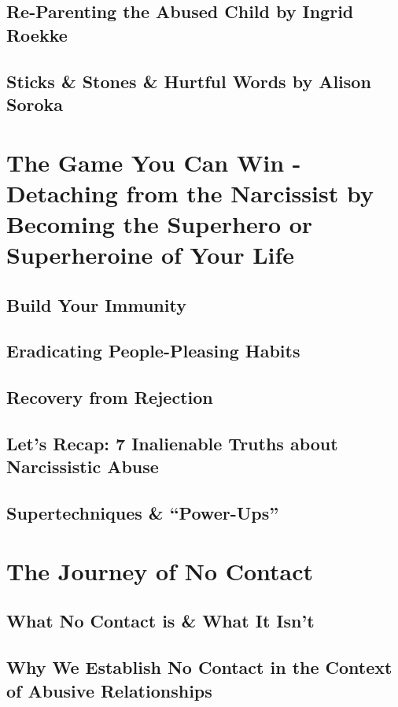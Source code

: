 \documentclass[oneside]{book}
\numberwithin{equation}{section}
\begin{document}
\subsection{Re-Parenting the Abused Child by Ingrid Roekke}

\subsection{Sticks \& Stones \& Hurtful Words by Alison Soroka}

\section{The Game You Can Win - Detaching from the Narcissist by Becoming the Superhero or Superheroine of Your Life}

\subsection{Build Your Immunity}

\subsection{Eradicating People-Pleasing Habits}

\subsection{Recovery from Rejection}

\subsection{Let's Recap: 7 Inalienable Truths about Narcissistic Abuse}

\subsection{Supertechniques \& ``Power-Ups''}

\section{The Journey of No Contact}

\subsection{What No Contact is \& What It Isn't}

\subsection{Why We Establish No Contact in the Context of Abusive Relationships}
\end{document}
